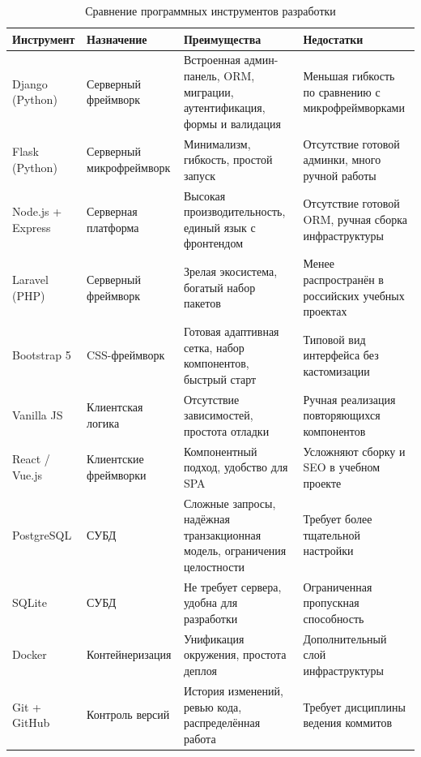 \documentclass[14pt, a4paper]{extarticle}
\begin{document}
\begin{table}[ht!]
\caption{Сравнение программных инструментов разработки}
\label{tab:tech}
\small
\begin{tabularx}{\textwidth}{|>{\RaggedRight\arraybackslash}p{}|>{\RaggedRight\arraybackslash}p{}|>{\RaggedRight\arraybackslash}X|>{\RaggedRight\arraybackslash}X|}
\hline
\textbf{Инструмент} & \textbf{Назначение} & \textbf{Преимущества} & \textbf{Недостатки} \\ \hline
Django (Python) & Серверный фреймворк & Встроенная админ-панель, ORM, миграции, аутентификация, формы и валидация & Меньшая гибкость по сравнению с микрофреймворками \\ \hline
Flask (Python) & Серверный микрофреймворк & Минимализм, гибкость, простой запуск & Отсутствие готовой админки, много ручной работы \\ \hline
Node.js + Express & Серверная платформа & Высокая производительность, единый язык с фронтендом & Отсутствие готовой ORM, ручная сборка инфраструктуры \\ \hline
Laravel (PHP) & Серверный фреймворк & Зрелая экосистема, богатый набор пакетов & Менее распространён в российских учебных проектах \\ \hline
Bootstrap 5 & CSS-фреймворк & Готовая адаптивная сетка, набор компонентов, быстрый старт & Типовой вид интерфейса без кастомизации \\ \hline
Vanilla JS & Клиентская логика & Отсутствие зависимостей, простота отладки & Ручная реализация повторяющихся компонентов \\ \hline
React / Vue.js & Клиентские фреймворки & Компонентный подход, удобство для SPA & Усложняют сборку и SEO в учебном проекте \\ \hline
PostgreSQL & СУБД & Сложные запросы, надёжная транзакционная модель, ограничения целостности & Требует более тщательной настройки \\ \hline
SQLite & СУБД & Не требует сервера, удобна для разработки & Ограниченная пропускная способность \\ \hline
Docker & Контейнеризация & Унификация окружения, простота деплоя & Дополнительный слой инфраструктуры \\ \hline
Git + GitHub & Контроль версий & История изменений, ревью кода, распределённая работа & Требует дисциплины ведения коммитов \\ \hline
\end{tabularx}
\end{table}
\end{document}
